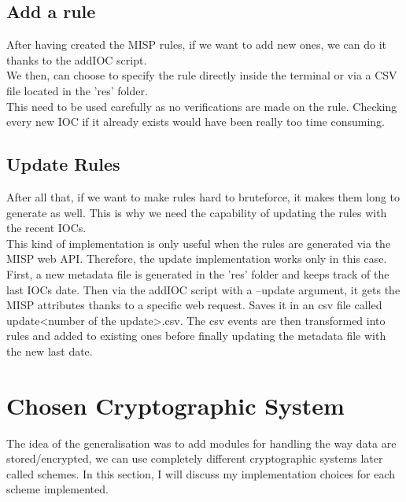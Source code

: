 \documentclass{eplmastersthesis}
\begin{document}
\subsection{Add a rule}
After having created the MISP rules, if we want to add new ones, we can do it thanks to the addIOC script.\\
We then, can choose to specify the rule directly inside the terminal or via a CSV file located in the 'res' folder.\\
This need to be used carefully as no verifications are made on the rule. Checking every new IOC if it already exists would have been really too time consuming.

\subsection{Update Rules}
After all that, if we want to make rules hard to bruteforce, it makes them long to generate as well. This is why we need the capability of updating the rules with the recent IOCs.\\
This kind of implementation is only useful when the rules are generated via the MISP web API. Therefore, the update implementation works only in this case.\\
First, a new metadata file is generated in the 'res' folder and keeps track of the last IOCs date. Then via the addIOC script with a --update argument, it gets the MISP attributes thanks to a specific web request. Saves it in an csv file called update<number of the update>.csv.
The csv events are then transformed into rules and added to existing ones before finally updating the metadata file with the new last date.

\section{Chosen Cryptographic System}
The idea of the generalisation was to add modules for handling the way data are stored/encrypted, we can use completely different cryptographic systems later called schemes. In this section, I will discuss my implementation choices for each scheme implemented.
\end{document}

